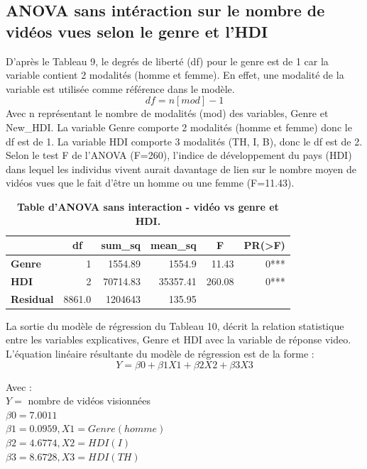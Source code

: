 \documentclass[12pt, a4paper, titlepage, table]{article}
\begin{document}
	\subsection{ANOVA sans intéraction sur le nombre de vidéos vues selon le genre et l'HDI}
	
	D'après le Tableau 9, le degrés de liberté (df) pour le genre est de 1 car la variable contient 2 modalités (homme et femme).
	En effet, une modalité de la variable est utilisée comme référence dans le modèle.
	\[ df = n[mod] - 1 \]
	Avec n représentant le nombre de modalités (mod) des variables, Genre et New\_HDI.
	La variable Genre comporte 2 modalités (homme et femme) donc le df est de 1. La variable HDI comporte 3 modalités (TH, I, B), 
	donc le df est de 2. Selon le test F de l'ANOVA (F=260), l'indice de développement du pays (HDI) dans lequel les individus vivent aurait
	davantage de lien sur le nombre moyen de vidéos vues que le fait d'être un homme ou une femme (F=11.43).
	  
	\begin{table}[H]
		\centering
		\fontsize{12}{20}\selectfont
		\begin{tabular}{|l|r|r|r|r|r|}
			\hline
					\multicolumn{1}{|c|}{\textbf{}}&
					\multicolumn{1}{c|}{\textbf{df}}&
					\multicolumn{1}{c|}{\textbf{sum\_sq}}&
					\multicolumn{1}{c|}{\textbf{mean\_sq}}&
					\multicolumn{1}{c|}{\textbf{F}}&
					\multicolumn{1}{c|}{\textbf{PR(>F)}}\\
			\hline
				\textbf{Genre}&	1&	1554.89&	1554.9&	11.43&	0***\\
				\textbf{HDI}&	2&	70714.83&	35357.41&	260.08&	0***\\
				\textbf{Residual}&	8861.0&	1204643&	135.95&		&		\\
			\hline
		\end{tabular}
		\caption{\textbf{Table d'ANOVA sans interaction - vidéo vs genre et HDI.}}
	\end{table}

	La sortie du modèle de régression du Tableau 10, décrit la relation statistique entre les variables explicatives, Genre et HDI 
	avec la variable de réponse video. L'équation linéaire résultante du modèle de régression est de la forme : 
	\[ Y=\beta0 + \beta1X1 + \beta2X2 + \beta3X3 \]
	
	Avec :\\
	$Y =$ nombre de vidéos visionnées\\
	$\beta0 = 7.0011$\\
	$\beta1 = 0.0959, X1 = Genre(homme)$\\
	$\beta2 = 4.6774, X2 = HDI(I)$\\
	$\beta3 = 8.6728, X3 = HDI(TH)$\\
	
\end{document}
